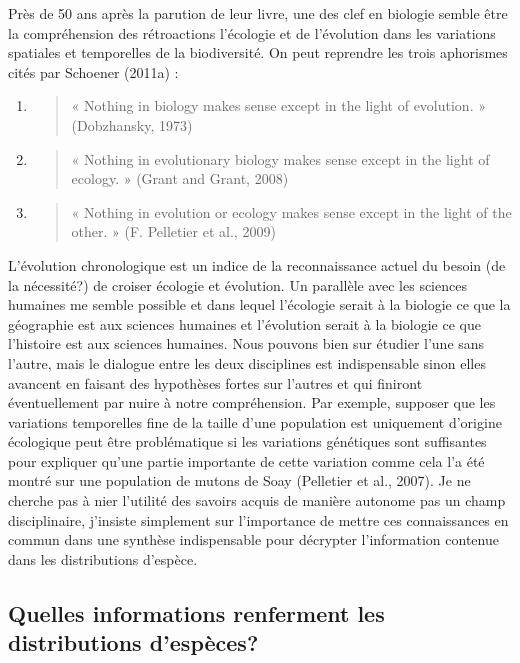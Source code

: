 Près de 50 ans après la parution de leur livre, une des clef en biologie
semble être la compréhension des rétroactions l'écologie et de
l'évolution dans les variations spatiales et temporelles de la
biodiversité. On peut reprendre les trois aphorismes cités par Schoener
(2011a) :

\begin{enumerate}
\def\labelenumi{\arabic{enumi}.}
\item
  \begin{quote}
  « Nothing in biology makes sense except in the light of evolution. »
  (Dobzhansky, 1973)
  \end{quote}
\item
  \begin{quote}
  « Nothing in evolutionary biology makes sense except in the light of
  ecology. » (Grant and Grant, 2008)
  \end{quote}
\item
  \begin{quote}
  « Nothing in evolution or ecology makes sense except in the light of
  the other. » (F. Pelletier et al., 2009)
  \end{quote}
\end{enumerate}

L'évolution chronologique est un indice de la reconnaissance actuel du
besoin (de la nécessité?) de croiser écologie et évolution. Un parallèle
avec les sciences humaines me semble possible et dans lequel l'écologie
serait à la biologie ce que la géographie est aux sciences humaines et
l'évolution serait à la biologie ce que l'histoire est aux sciences
humaines. Nous pouvons bien sur étudier l'une sans l'autre, mais le
dialogue entre les deux disciplines est indispensable sinon elles
avancent en faisant des hypothèses fortes sur l'autres et qui finiront
éventuellement par nuire à notre compréhension. Par exemple, supposer
que les variations temporelles fine de la taille d'une population est
uniquement d'origine écologique peut être problématique si les
variations génétiques sont suffisantes pour expliquer qu'une partie
importante de cette variation comme cela l'a été montré sur une
population de mutons de Soay (Pelletier et al., 2007). Je ne cherche pas
à nier l'utilité des savoirs acquis de manière autonome pas un champ
disciplinaire, j'insiste simplement sur l'importance de mettre ces
connaissances en commun dans une synthèse indispensable pour décrypter
l'information contenue dans les distributions d'espèce.

\subsection*{Quelles informations renferment les distributions
d'espèces?}\label{quelles-informations-renferment-les-distributions-despuxe8ces}

